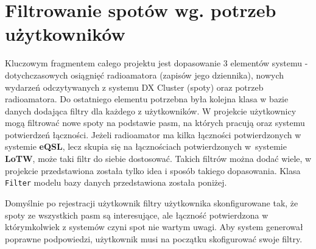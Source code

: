 \documentclass[]{mgr}
\begin{document}
        \section{Filtrowanie spotów wg. potrzeb użytkowników}
        Kluczowym fragmentem całego projektu jest dopasowanie 3 elementów systemu - dotychczasowych osiągnięć radioamatora (zapisów jego dziennika), nowych wydarzeń odczytywanych z systemu DX Cluster (spoty) oraz potrzeb radioamatora. Do ostatniego elementu potrzebna była kolejna klasa w bazie danych dodająca filtry dla każdego z użytkowników. W projekcie użytkownicy mogą filtrować nowe spoty na podstawie pasm, na których pracują oraz systemu potwierdzeń łączności. Jeżeli radioamator ma kilka łączności potwierdzonych w systemie \textbf{eQSL}, lecz skupia się na łącznościach potwierdzonych w~systemie \textbf{LoTW}, może taki filtr do siebie dostosować. Takich filtrów można dodać wiele, w projekcie przedstawiona została tylko idea i sposób takiego dopasowania. Klasa \texttt{Filter} modelu bazy danych przedstawiona została poniżej.
        
        Domyślnie po rejestracji użytkownik filtry użytkownika skonfigurowane tak, że spoty ze wszystkich pasm są interesujące, ale łączność potwierdzona w którymkolwiek z systemów czyni spot nie wartym uwagi. Aby system generował poprawne podpowiedzi, użytkownik musi na początku skofigurować swoje filtry.
\end{document}
